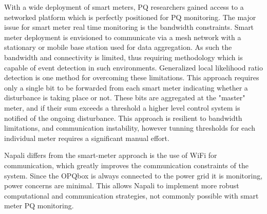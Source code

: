 With a wide deployment of smart meters, PQ researchers gained access to a networked platform which is perfectly positioned for PQ monitoring.\cite{hoglund2012using} The major issue for smart meter real time monitoring is the bandwidth constraints. Smart meter deployment is envisioned to communicate via a mesh network with a stationary or mobile base station used for data aggregation. As such the bandwidth and connectivity is limited, thus requiring methodology which is capable of event detection in such environments. Generalized local likelihood ratio detection is one method for overcoming these limitations. This approach requires only a single bit to be forwarded from each smart meter indicating whether a disturbance is taking place or not. These bits are aggregated at the "master" meter, and if their sum exceeds a threshold a higher level control system is notified of the ongoing disturbance.\cite{li2016cooperative} This approach is resilient to bandwidth limitations, and communication instability, however tunning thresholds for each individual meter requires a significant manual effort.

Napali differs from the smart-meter approach is the use of WiFi for communication, which greatly improves the communication constraints of the system. Since the OPQbox is always connected to the power grid it is monitoring, power concerns are minimal. This allows Napali to implement more robust computational and communication strategies, not commonly possible with smart meter PQ monitoring.

